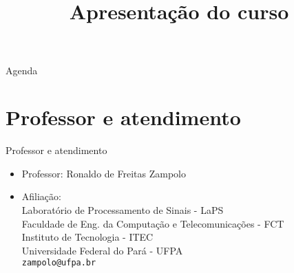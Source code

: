 




\title{\cursogrande\\ \vspace{1cm}Apresentação do curso}


   
   \maketitle[randomdots={false}]
   \begin{slide}{Agenda}
      \tableofcontents[content=sections]
   \end{slide}

   \section[ slide = true]{Professor e atendimento}
      \begin{slide}[toc=]{Professor e atendimento}
         \begin{itemize}
            \item Professor: Ronaldo de Freitas Zampolo
            \item Afiliação:\\
                  Laboratório de Processamento de Sinais - LaPS\\
                  Faculdade de Eng. da Computação e Telecomunicações - FCT\\
                  Instituto de Tecnologia - ITEC\\
                  Universidade Federal do Pará - UFPA\\
                  \texttt{zampolo@ufpa.br}\\ 
         \end{itemize}
      \end{slide}
      
